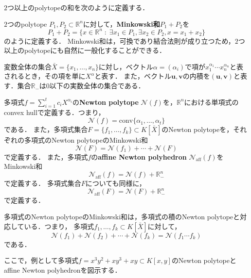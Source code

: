 $2$つ以上のpolytopeの和を次のように定義する．
\begin{definition}
	$2$つのpolytope $P_1, P_2 \subset \mathbb{R}^n$に対して，\textbf{Minkowski和}$P_1 + P_2$を
	$$P_1 + P_2 = \{ x \in \mathbb{R}^n \;:\; \exists x_1 \in P_1, \exists x_2 \in P_2, x = x_1 + x_2\}$$
	のように定義する．
	Minkowski和は，可換であり結合法則が成り立つため，$2$つ以上のpolytopeにも自然に一般化することができる．
\end{definition}
変数全体の集合$\bar{X} = \{x_1, \dots, x_n\}$に対し，ベクトル$\alpha = (\alpha_i)$で項が$x_1^{\alpha_1} \cdots x_n^{\alpha_n}$と表されるとき，その項を単に$X^{\alpha}$と表す．
また，ベクトル$\bm{u}, \bm{v}$の内積を$(\bm{u}, \bm{v})$と表す．集合$\mathbb{R}_{-}$は$0$以下の実数全体の集合である．
\begin{definition}
	多項式$\displaystyle f = \sum_{i=1}^t c_i X^{\alpha_i}$の\textbf{Newton polytope} $\mathcal{N}(f)$を，$\mathbb{R}^n$における単項式のconvex hullで定義する．つまり，
	$$\mathcal{N}(f) = \mathrm{conv}\{\alpha_1, \dots, \alpha_t\}$$
	である．
	また，多項式集合$F = \{f_1, \dots, f_k\} \subset K[\bar{X}]$のNewton polytopeを，それぞれの多項式のNewton polytopeのMinkowski和
	$$\mathcal{N}(F) = \mathcal{N}(f_1) + \cdots + \mathcal{N}(F)$$
	で定義する．
	また，多項式$f$の\textbf{affine Newton polyhedron} $\mathcal{N}_{\mathrm{aff}}(f)$をMinkowski和
	$$\mathcal{N}_{\mathrm{aff}}(f) = \mathcal{N}(f) + \mathbb{R}_{-}^n$$
	で定義する．
	多項式集合$F$についても同様に，$$\mathcal{N}_{\mathrm{aff}}(F) = \mathcal{N}(F) + \mathbb{R}_{-}^n$$で定義する．
\end{definition}

\begin{remark*}
	多項式のNewton polytopeのMinkowski和は，多項式の積のNewton polytopeと対応している．つまり，
	多項式$f_1, \dots, f_k \subset K[\bar{X}]$に対して，
	$$\mathcal{N}(f_1) + \mathcal{N}(f_2) + \cdots + \mathcal{N}(f_k) = \mathcal{N}(f_1 \cdots f_k)$$
	である．
\end{remark*}

ここで，例として多項式$f = x^3y^2 + xy^3 + xy \subset K[x, y]$のNewton polytopeとaffine Newton polyhedronを図示する．
\\

